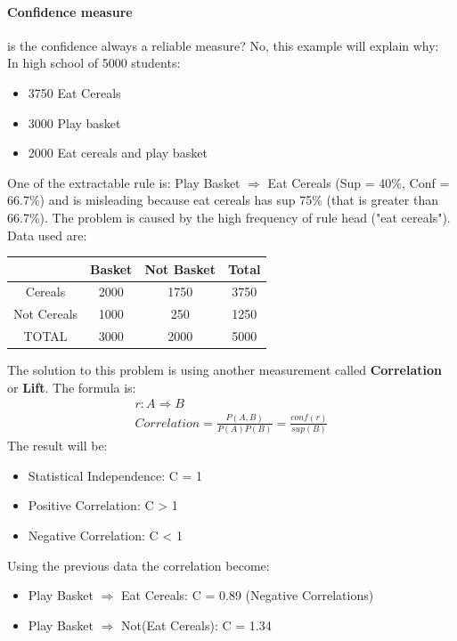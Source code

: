 \documentclass[12pt]{article}
\begin{document}
\paragraph{Confidence measure} is the confidence always a reliable measure? No, this example will explain why:\\
In high school of 5000 students:
\begin{itemize}
  \item 3750 Eat Cereals
  \item 3000 Play basket
  \item 2000 Eat cereals and play basket
\end{itemize}
One of the extractable rule is: Play Basket $\Rightarrow$ Eat Cereals (Sup = 40\%, Conf = 66.7\%) and is misleading because eat cereals has sup 75\% (that is greater than 66.7\%). The problem is caused by the high frequency of rule head ("eat cereals"). Data used are:
\begin{center}
  \begin{tabular}{ |c|c|c|c| }
    \hline
    & \textbf{Basket} & \textbf{Not Basket} & \textbf{Total}\\
    \hline
    \hline
    Cereals & 2000 & 1750 & 3750\\
    \hline
    Not Cereals & 1000 & 250 & 1250\\
    \hline
    TOTAL & 3000 & 2000 & 5000\\
    \hline
  \end{tabular}
\end{center}
The solution to this problem is using another measurement called \textbf{Correlation} or \textbf{Lift}. The formula is:
\begin{equation}
  \begin{gathered}
    r: A \Rightarrow B\\
    Correlation = \frac{P(A,B)}{P(A)P(B)} = \frac{conf(r)}{sup(B)}
  \end{gathered}
\end{equation}
The result will be:
\begin{itemize}
  \item Statistical Independence: C = 1
  \item Positive Correlation: C > 1
  \item Negative Correlation: C < 1
\end{itemize}
Using the previous data the correlation become:
\begin{itemize}
  \item Play Basket $\Rightarrow$ Eat Cereals: C = 0.89 (Negative Correlations)
  \item Play Basket $\Rightarrow$ Not(Eat Cereals): C = 1.34
\end{itemize}
\end{document}
